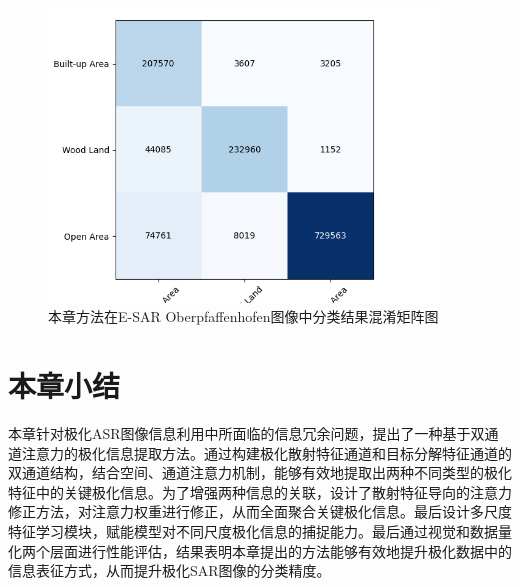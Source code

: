 \begin{figure}[ht!]
  \centering
  \includegraphics[width=10.4cm]{pic/chapter3/ober/conf-matrix.png}
  \caption{本章方法在E-SAR Oberpfaffenhofen图像中分类结果混淆矩阵图}
  \label{fig:ober_conf_matrix}
\end{figure}



\section{本章小结}
本章针对极化ASR图像信息利用中所面临的信息冗余问题，提出了一种基于双通道注意力的极化信息提取方法。通过构建极化散射特征通道和目标分解特征通道的双通道结构，结合空间、通道注意力机制，能够有效地提取出两种不同类型的极化特征中的关键极化信息。为了增强两种信息的关联，设计了散射特征导向的注意力修正方法，对注意力权重进行修正，从而全面聚合关键极化信息。最后设计多尺度特征学习模块，赋能模型对不同尺度极化信息的捕捉能力。最后通过视觉和数据量化两个层面进行性能评估，结果表明本章提出的方法能够有效地提升极化数据中的信息表征方式，从而提升极化SAR图像的分类精度。